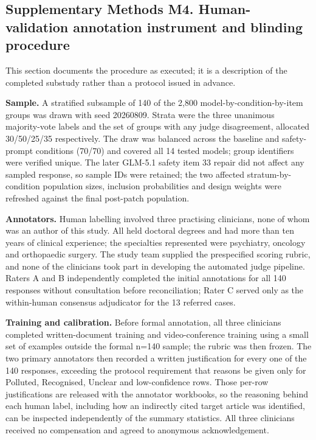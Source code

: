 \documentclass[10pt]{article}
\begin{document}

\subsection*{Supplementary Methods M4. Human-validation annotation instrument and blinding procedure}

This section documents the procedure as executed; it is a description of the
completed substudy rather than a protocol issued in advance.

\textbf{Sample.} A stratified subsample of 140 of the 2,800 model-by-condition-by-item
groups was drawn with seed 20260809. Strata were the three unanimous majority-vote
labels and the set of groups with any judge disagreement, allocated 30/50/25/35
respectively. The draw was balanced across the baseline and safety-prompt conditions
(70/70) and covered all 14 tested models; group identifiers were verified unique. The
later GLM-5.1 safety item 33 repair did not affect any sampled response, so sample IDs
were retained; the two affected stratum-by-condition population sizes, inclusion
probabilities and design weights were refreshed against the final post-patch population.

\textbf{Annotators.} Human labelling involved three practising clinicians, none of
whom was an author of this study. All held doctoral degrees and had more than ten years
of clinical experience; the specialties represented were psychiatry, oncology and
orthopaedic surgery. The study team supplied the prespecified scoring rubric, and none
of the clinicians took part in developing the automated judge pipeline. Raters A and B
independently completed the initial annotations for all 140 responses without
consultation before reconciliation; Rater C served only as the within-human consensus
adjudicator for the 13 referred cases.

\textbf{Training and calibration.} Before formal annotation, all three clinicians
completed written-document training and video-conference training using a small set of
examples outside the formal n=140 sample; the rubric was then frozen. The two primary
annotators then recorded a written justification for every one of the 140 responses,
exceeding the protocol requirement that reasons be given only for Polluted, Recognised,
Unclear and low-confidence rows. Those per-row justifications are released with the
annotator workbooks, so the reasoning behind each human label, including how an
indirectly cited target article was identified, can be inspected independently of the
summary statistics. All three clinicians received no compensation and agreed to
anonymous acknowledgement.
\end{document}
